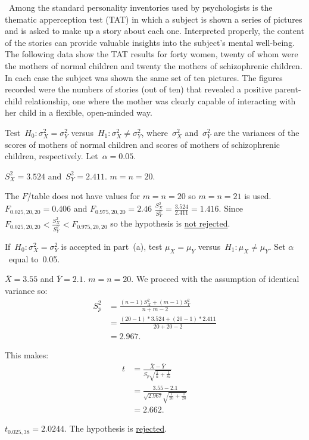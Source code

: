 \begin{problem}
  ~Among the standard personality inventories used by psychologists is the thematic apperception test (TAT) in which a subject is shown a series of pictures and is asked to make up a story about each one. Interpreted properly, the content of the stories can provide valuable insights into the subject’s mental well-being. The following data show the TAT results for forty women, twenty of whom were the mothers of normal children and twenty the mothers of schizophrenic children. In each case the subject was shown the same set of ten pictures. The figures recorded were the numbers of stories (out of ten) that revealed a positive parent-child relationship, one where the mother was clearly capable of interacting with her child in a flexible, open-minded way.
\end{problem}

\begin{subproblem}
  Test~${H_0 : \sigma_{X}^{2} = \sigma_{Y}^{2}}$ versus~${H_1 : \sigma_{X}^{2} \ne \sigma_{Y}^{2}}$, where~$\sigma_{X}^2$ and~$\sigma_{Y}^{2}$ are the variances of the scores of mothers of normal children and scores of mothers of schizophrenic children, respectively. Let~${\alpha = 0.05}$.
\end{subproblem}

${S^{2}_{X} = 3.524}$ and~${S^{2}_Y = 2.411}$.  ${m = n = 20}$.

The $F$\=/table does not have values for ${m = n = 20}$ so ${m = n = 21}$ is used. ${F_{0.025,20,20} = 0.406}$ and ${F_{0.975,20,20} = 2.46}$  ${\frac{S^{2}_{X}}{S^{2}_{Y}} = \frac{3.524}{2.411} = 1.416}$.  Since ${F_{0.025,20,20} < \frac{S^{2}_{X}}{S^{2}_{Y}} < F_{0.975,20,20}}$ so the hypothesis is \underline{not rejected}.

\begin{subproblem}
  If~${H_0: \sigma_{X}^{2} = \sigma_{Y}^{2}}$ is accepted in part~(a), test ${\mu_{X} = \mu_{Y}}$ versus~${H_{1}: \mu_{X} \ne \mu_{Y}}$. Set $\alpha$~equal to~0.05.
\end{subproblem}

${\bar{X} = 3.55}$ and ${\bar{Y} = 2.1}$.  ${m = n = 20}$.  We proceed with the assumption of identical variance so:
\begin{align}
  S^{2}_{p} &= \frac{(n-1)S^{2}_{X} + (m-1)S^{2}_{Y}}{n + m - 2} \\
            &= \frac{(20 - 1) * 3.524+ (20 - 1) * 2.411}{20 + 20 - 2} \\
            &= 2.967 \text{.}
\end{align}

This makes:
\begin{align}
  t &= \frac{\bar{X} - \bar{Y}}{S_{p} \sqrt{\frac{1}{n} + \frac{1}{m}}} \\
    &=  \frac{3.55 - 2.1}{\sqrt{2.967} \sqrt{\frac{1}{20} + \frac{1}{20}}} \\
    &= 2.662\text{.}
\end{align}

${t_{0.025,38} = 2.0244}$.  The hypothesis is \underline{rejected}.
